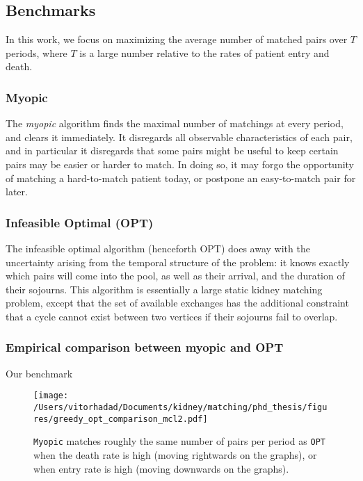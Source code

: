 \documentclass[12pt]{article}
\begin{document}
\subsection{Benchmarks}

In this work, we focus on maximizing the average number of matched pairs over $T$ periods, where $T$ is a large number relative to the rates of patient entry and death. 

\subsubsection{Myopic}

The \emph{myopic} algorithm finds the maximal number of matchings at every period, and clears it immediately. It disregards all observable characteristics of each pair, and in particular it disregards that some pairs might be useful to keep certain pairs may be easier or harder to match. In doing so, it may forgo the opportunity of matching a hard-to-match patient today, or postpone an easy-to-match pair for later.

\subsubsection{Infeasible Optimal (OPT)}

The infeasible optimal algorithm (henceforth OPT) does away with the uncertainty arising from the temporal structure of the problem: it knows exactly which pairs will come into the pool, as well as their arrival, and the duration of their sojourns. This algorithm is essentially a large static kidney matching problem, except that the set of available exchanges has the additional constraint that a cycle cannot exist between two vertices if their sojourns fail to overlap.

\subsubsection{Empirical comparison between myopic and OPT}

Our benchmark 

 \begin{figure}[H]
 \centering
 \hspace*{-4cm}
 \texttt{[image: /Users/vitorhadad/Documents/kidney/matching/phd\_thesis/figures/greedy\_opt\_comparison\_mcl2.pdf]}
 \caption{\texttt{Myopic} matches roughly the same number of pairs per period as \texttt{OPT} when the death rate is high (moving rightwards on the graphs), or when entry rate is high (moving downwards on the graphs).}
 \label{fig:greedy_opt_comparison_mcl2}
 \end{figure}
 
\end{document}
